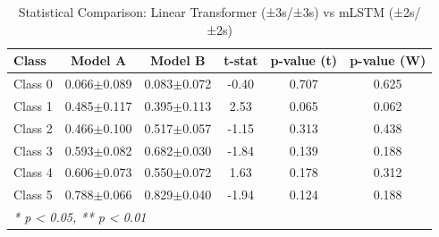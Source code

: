 \begin{table}[htbp]
\centering
\caption{Statistical Comparison: Linear Transformer (±3s/±3s) vs mLSTM (±2s/±2s)}
\label{tab:comparison_class_linear_transformer_±3s_±3s_vs_mlstm_±2s_±2s}
\begin{tabular}{lccccc}
\toprule
\textbf{Class} & \textbf{Model A} & \textbf{Model B} & \textbf{t-stat} & \textbf{p-value (t)} & \textbf{p-value (W)} \\
\midrule
Class 0 & 0.066$\pm$0.089 & 0.083$\pm$0.072 & -0.40 & 0.707 & 0.625 \\
Class 1 & 0.485$\pm$0.117 & 0.395$\pm$0.113 & 2.53 & 0.065 & 0.062 \\
Class 2 & 0.466$\pm$0.100 & 0.517$\pm$0.057 & -1.15 & 0.313 & 0.438 \\
Class 3 & 0.593$\pm$0.082 & 0.682$\pm$0.030 & -1.84 & 0.139 & 0.188 \\
Class 4 & 0.606$\pm$0.073 & 0.550$\pm$0.072 & 1.63 & 0.178 & 0.312 \\
Class 5 & 0.788$\pm$0.066 & 0.829$\pm$0.040 & -1.94 & 0.124 & 0.188 \\
\bottomrule
\multicolumn{6}{l}{\textit{* p < 0.05, ** p < 0.01}} \\
\end{tabular}
\end{table}